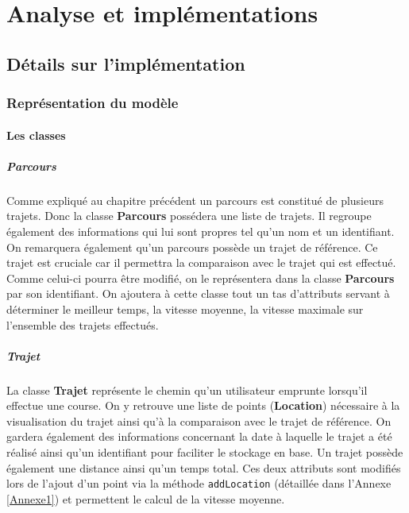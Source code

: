 
\part{Analyse et implémentations}
\chapter{Détails sur l'implémentation}
\section{Représentation du modèle}
\subsection{Les classes}
\subsubsection{Parcours}
Comme expliqué au chapitre précédent un parcours est constitué de plusieurs trajets. Donc la classe {\bfseries Parcours} possédera une liste de trajets. Il regroupe également des informations qui lui sont propres tel qu'un nom et un identifiant. On remarquera également qu'un parcours possède un trajet de référence. Ce trajet est cruciale car il permettra la comparaison avec le trajet qui est effectué. Comme celui-ci pourra être modifié, on le représentera dans la classe {\bfseries Parcours} par son identifiant. On ajoutera à cette classe tout un tas d'attributs servant à déterminer le meilleur temps, la vitesse moyenne, la vitesse maximale sur l'ensemble des trajets effectués.

\subsubsection{Trajet}
La classe {\bfseries Trajet} représente le chemin qu'un utilisateur emprunte lorsqu'il effectue une course. On y retrouve une liste de points ({\bfseries Location}) nécessaire à la visualisation du trajet ainsi qu'à la comparaison avec le trajet de référence. On gardera également des informations concernant la date à laquelle le trajet a été réalisé ainsi qu'un identifiant pour faciliter le stockage en base. Un trajet possède également une distance ainsi qu'un temps total. Ces deux attributs sont modifiés lors de l'ajout d'un point via la méthode \verb!addLocation! (détaillée dans l'Annexe \ref{Annexe1}) et permettent le calcul de la vitesse moyenne.

